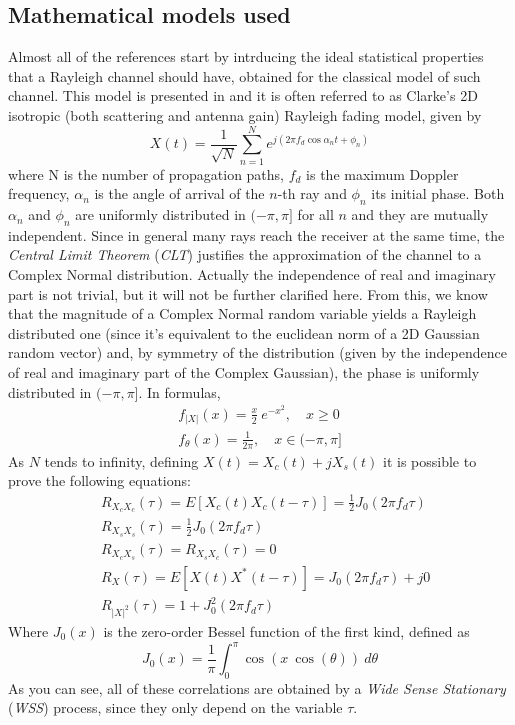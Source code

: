 \subsection{Mathematical models used} %
\label{subsec:math_models}

Almost all of the references start by intrducing the ideal statistical properties that a Rayleigh channel should have, obtained for the classical model of such channel. This model is presented in \cite{clarke} and it is often referred to as Clarke's 2D isotropic (both scattering and antenna gain) Rayleigh fading model, given by%
%
\begin{equation}
X(t) = \frac{1}{\sqrt{N}} \sum_{n=1}^{N} e^{j(2\pi f_d \cos \alpha_n t + \phi_n)}
\end{equation}%
%
where N is the number of propagation paths, $f_d$ is the maximum Doppler frequency, $\alpha_n$ is the angle of arrival of the $n$-th ray and $\phi_n$ its initial phase. Both $\alpha_n$ and $\phi_n$ are uniformly distributed in $(-\pi,\pi]$ for all $n$ and they are mutually independent. Since in general many rays reach the receiver at the same time, the \textit{Central Limit Theorem} (\textit{CLT}) justifies the approximation of the channel to a Complex Normal distribution. Actually the independence of real and imaginary part is not trivial, but it will not be further clarified here. From this, we know that the magnitude of a Complex Normal random variable yields a Rayleigh distributed one (since it's equivalent to the euclidean norm of a 2D Gaussian random vector) and, by symmetry of the distribution (given by the independence of real and imaginary part of the Complex Gaussian), the phase is uniformly distributed in $(-\pi,\pi]$. In formulas,%
%
\begin{align}
	f_{|X|}(x) = \frac{x}{2} \ e^{-x^2}, \quad x \geq 0\\
	f_{\theta}(x) = \frac{1}{2\pi}, \quad x \in (-\pi,\pi]
\end{align}%
%
As $N$ tends to infinity, defining $X(t) = X_c(t) + jX_s(t)$ it is possible to prove the following equations:%
%
\begin{subequations}
\begin{align}
&R_{X_cX_c}(\tau) = E[X_c(t)X_c(t-\tau)] = \frac{1}{2} J_0(2\pi f_d\tau)\\
&R_{X_sX_s}(\tau) = \frac{1}{2} J_0(2\pi f_d\tau)\\
&R_{X_cX_s}(\tau) = R_{X_sX_c}(\tau) = 0\\
&R_X(\tau) = E[X(t) X^*(t-\tau)] = J_0(2\pi f_d \tau) + j0\\
&R_{|X|^2}(\tau) = 1 + J_0^2(2\pi f_d \tau)
\end{align}
\end{subequations}%
%
Where $J_0(x)$ is the zero-order Bessel function of the first kind, defined as%
%
\begin{equation}
J_0(x) = \frac{1}{\pi} \int_0^\pi \cos( x \ \cos(\theta)) \ d\theta
\end{equation}%
%
As you can see, all of these correlations are obtained by a \textit{Wide Sense Stationary} (\textit{WSS}) process, since they only depend on the variable $\tau$.